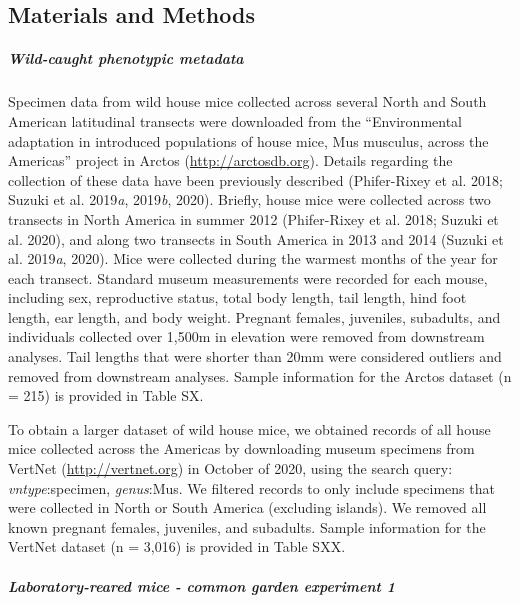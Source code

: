 \documentclass[]{article}
\let\oldsubparagraph\subparagraph
\renewcommand{\subparagraph}[1]{\oldsubparagraph{#1}\mbox{}}
\begin{document}
\newpage

\hypertarget{materials-and-methods}{%
\subsection{Materials and Methods}\label{materials-and-methods}}

\hypertarget{wild-caught-phenotypic-metadata}{%
\subparagraph{\texorpdfstring{\emph{Wild-caught phenotypic
metadata}}{Wild-caught phenotypic metadata}}\label{wild-caught-phenotypic-metadata}}

Specimen data from wild house mice collected across several North and
South American latitudinal transects were downloaded from the
``Environmental adaptation in introduced populations of house mice, Mus
musculus, across the Americas'' project in Arctos
(\url{http://arctosdb.org}). Details regarding the collection of these
data have been previously described (Phifer-Rixey et al. 2018; Suzuki et
al. 2019\emph{a}, 2019\emph{b}, 2020). Briefly, house mice were
collected across two transects in North America in summer 2012
(Phifer-Rixey et al. 2018; Suzuki et al. 2020), and along two transects
in South America in 2013 and 2014 (Suzuki et al. 2019\emph{a}, 2020).
Mice were collected during the warmest months of the year for each
transect. Standard museum measurements were recorded for each mouse,
including sex, reproductive status, total body length, tail length, hind
foot length, ear length, and body weight. Pregnant females, juveniles,
subadults, and individuals collected over 1,500m in elevation were
removed from downstream analyses. Tail lengths that were shorter than
20mm were considered outliers and removed from downstream analyses.
Sample information for the Arctos dataset (n = 215) is provided in Table
SX.

To obtain a larger dataset of wild house mice, we obtained records of
all house mice collected across the Americas by downloading museum
specimens from VertNet (\url{http://vertnet.org}) in October of 2020,
using the search query: \emph{vntype}:specimen, \emph{genus}:Mus. We
filtered records to only include specimens that were collected in North
or South America (excluding islands). We removed all known pregnant
females, juveniles, and subadults. Sample information for the VertNet
dataset (n = 3,016) is provided in Table SXX.

\hypertarget{laboratory-reared-mice---common-garden-experiment-1}{%
\subparagraph{\texorpdfstring{\emph{Laboratory-reared mice - common
garden experiment
1}}{Laboratory-reared mice - common garden experiment 1}}\label{laboratory-reared-mice---common-garden-experiment-1}}
\end{document}

